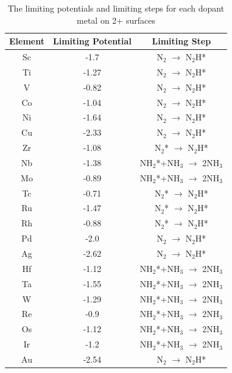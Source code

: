 \begin{table}
\begin{center}
\begin{tabular}{| c | c |c |}
\hline
Element & Limiting Potential & Limiting Step \\
\hline
Sc & -1.7 & N$_2$ $\rightarrow$ N$_2$H*\\
Ti & -1.27 & N$_2$ $\rightarrow$ N$_2$H*\\
V & -0.82 & N$_2$ $\rightarrow$ N$_2$H*\\
Co & -1.04 & N$_2$ $\rightarrow$ N$_2$H*\\
Ni & -1.64 & N$_2$ $\rightarrow$ N$_2$H*\\
Cu & -2.33 & N$_2$ $\rightarrow$ N$_2$H*\\
Zr & -1.08 & N$_2$* $\rightarrow$ N$_2$H*\\
Nb & -1.38 & NH$_2$*+NH$_3$ $\rightarrow$ 2NH$_3$\\
Mo & -0.89 & NH$_2$*+NH$_3$ $\rightarrow$ 2NH$_3$\\
Tc & -0.71 & N$_2$* $\rightarrow$ N$_2$H*\\
Ru & -1.47 & N$_2$* $\rightarrow$ N$_2$H*\\
Rh & -0.88 & N$_2$* $\rightarrow$ N$_2$H*\\
Pd & -2.0 & N$_2$ $\rightarrow$ N$_2$H*\\
Ag & -2.62 & N$_2$ $\rightarrow$ N$_2$H*\\
Hf & -1.12 & NH$_2$*+NH$_3$ $\rightarrow$ 2NH$_3$\\
Ta & -1.55 & NH$_2$*+NH$_3$ $\rightarrow$ 2NH$_3$\\
W & -1.29 & NH$_2$*+NH$_3$ $\rightarrow$ 2NH$_3$\\
Re & -0.9 & NH$_2$*+NH$_3$ $\rightarrow$ 2NH$_3$\\
Os & -1.12 & NH$_2$*+NH$_3$ $\rightarrow$ 2NH$_3$\\
Ir & -1.2 & NH$_2$*+NH$_3$ $\rightarrow$ 2NH$_3$\\
Au & -2.54 & N$_2$ $\rightarrow$ N$_2$H*\\
\hline
\end{tabular}
\end{center}
\caption{The limiting potentials and limiting steps for each dopant metal on 2+ surfaces}\label{table:limiting_steps}\end{table}

